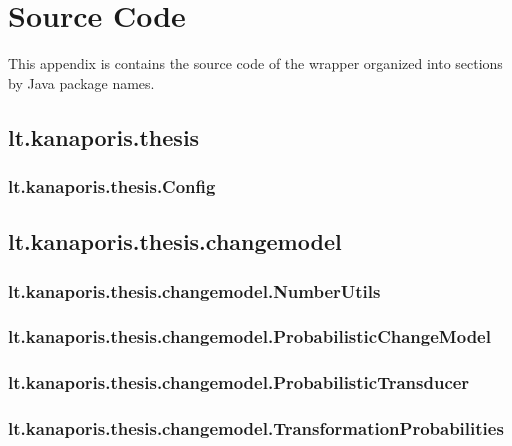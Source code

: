 \chapter{Source Code}


This appendix is contains the source code of the wrapper organized into sections by Java package names.


\section{lt.kanaporis.thesis}
\subsection{lt.kanaporis.thesis.Config}



\section{lt.kanaporis.thesis.changemodel}

\subsection{lt.kanaporis.thesis.changemodel.NumberUtils}


\subsection{lt.kanaporis.thesis.changemodel.ProbabilisticChangeModel}


\subsection{lt.kanaporis.thesis.changemodel.ProbabilisticTransducer}


\subsection{lt.kanaporis.thesis.changemodel.TransformationProbabilities}



